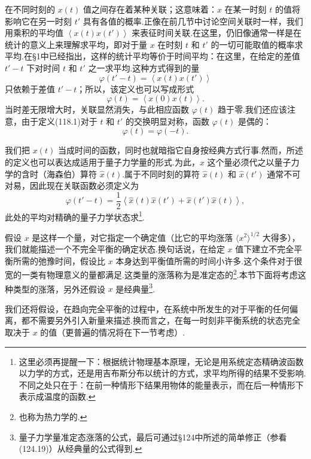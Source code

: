 在不同时刻的 $x(t)$ 值之间存在着某种关联；这意味着：$x$ 在某一时刻 $t$ 的值将影响它在另一时刻 $t'$ 具有各值的概率.正像在前几节中讨论空间关联时一样，我们用乘积的平均值
$\left\langle x(t)x(t')\right\rangle$ 来表征时间关联.在这里，仍旧像通常一样是在统计的意义上来理解求平均，即对于量 $x$ 在时刻 $t$ 和 $t'$ 的一切可能取值的概率求平均.在§1中已经指出，这样的统计平均等价于时间平均：在这里，在给定的差值 $t'-t$ 下对时间 $t$ 和 $t'$ 之一求平均.这种方式得到的量
\begin{equation}
  \varphi(t'-t)=\left\langle x(t)x(t')\right\rangle
\end{equation}
只依赖于差值 $t'-t$；所以，该定义也可以写成形式
\begin{equation}
  \varphi(t)=\left\langle x(0)x(t)\right\rangle.
\end{equation}
当时差无限增大时，关联显然消失，与此相应函数 $\varphi(t)$ 趋于零.我们还应该注意，由于定义(118.1)对于 $t$ 和 $t'$ 的交换明显对称，函数 $\varphi(t)$ 是偶的：
\begin{equation}
  \varphi(t)=\varphi(-t).
\end{equation}

我们把 $x(t)$ 当成时间的函数，同时也就暗指它自身按经典方式行事.然而，所述的定义也可以表达成适用于量子力学量的形式.为此，$x$ 这个量必须代之以量子力学的含时（海森伯）算符
$\hat{x}(t)$.属于不同时刻的算符 $\hat{x}(t)$ 和 $\hat{x}(t')$ 通常不可对易，因此现在关联函数必须定义为
\begin{equation}
  \varphi(t'-t)=\frac{1}{2}\left\langle
  \hat{x}(t)\hat{x}(t')+\hat{x}(t')\hat{x}(t)\right\rangle,
\end{equation}
此处的平均对精确的量子力学状态求\footnote{这里必须再提醒一下：根据统计物理基本原理，无论是用系统定态精确波函数以力学的方式，还是用吉布斯分布以统计的方式，求平均所得的结果不受影响. 不同之处只在于：在前一种情形下结果用物体的能量表示，而在后一种情形下表示成温度的函数.}.

假设 $x$ 是这样一个量，对它指定一个确定值（比它的平均涨落
$\langle x^{2}\rangle^{1/2}$ 大得多），我们就能描述一个不完全平衡的确定状态.换句话说，在给定 $x$ 值下建立不完全平衡所需的弛豫时间，假设比 $x$ 本身达到平衡值所需的时间小许多.这个条件对于很宽的一类有物理意义的量都满足.这类量的涨落称为是准定态的\footnote{也称为热力学的.}.本节下面将考虑这种类型的涨落，另外还假设 $x$ 是经典量\footnote{量子力学量准定态涨落的公式，最后可通过§124中所述的简单修正（参看(124.19)）从经典量的公式得到.}.

我们还将假设，在趋向完全平衡的过程中，在系统中所发生的对于平衡的任何偏离，都不需要另外引入新量来描述.换而言之，在每一时刻非平衡系统的状态完全取决于 $x$ 的值（更普遍的情况将在下一节考虑）.

